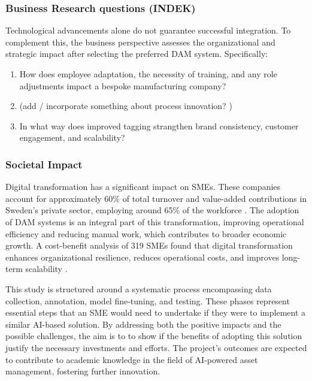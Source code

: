 \documentclass[a4paper,10pt,twocolumn]{article}
\numberwithin{figure}{section}
\numberwithin{table}{section}
\begin{document}
\subsubsection{Business Research questions (INDEK)}
\vspace{0.3cm}
Technological advancements alone do not guarantee successful integration. To complement this,
the business perspective assesses the organizational and strategic impact after selecting the preferred DAM system. Specifically:

\begin{enumerate}[label=(\alph*), resume]
    \item How does employee adaptation, the necessity of training, and any role adjustments impact a bespoke manufacturing company? 
    \item (add / incorporate something about process innovation? )
    \item In what way does improved tagging strangthen brand consistency, customer engagement, and scalability?
\end{enumerate}   

\subsubsection{Societal Impact}
\vspace{0.2cm}
Digital transformation has a significant impact on SMEs.
These companies account for approximately 60\% of total turnover and value-added 
contributions in Sweden’s private sector, employing around 65\% of the 
workforce \citep{tillvaxtverket2021}.
The adoption of DAM systems is an integral part of this transformation, 
improving operational efficiency and reducing manual work,
which contributes to broader economic growth. A cost-benefit analysis of 319 SMEs 
found that digital transformation enhances organizational resilience, reduces 
operational costs, and improves long-term scalability \citep{teng2022}.

\vspace{0.3cm}
This study is structured around a systematic process 
encompassing data collection, annotation, model fine-tuning, and testing. 
These phases represent essential steps that an SME would need to undertake 
if they were to implement a similar AI-based solution. 
By addressing both the positive impacts and the possible challenges, the aim is to
to show if the benefits of adopting this solution
justify the necessary investments and efforts.
The project’s outcomes are expected to contribute to 
academic knowledge in the field of AI-powered asset management, 
fostering further innovation. 
\end{document}

